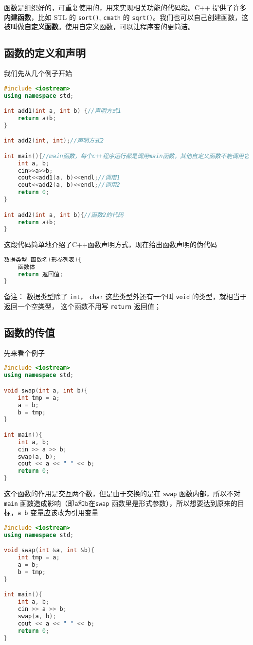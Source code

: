 
\begin{issues}
\issueDraft
\end{issues}

函数是组织好的，可重复使用的，用来实现相关功能的代码段。C++ 提供了许多\textbf{内建函数}，比如 STL 的 \verb|sort()|, \verb|cmath| 的 \verb|sqrt()|。我们也可以自己创建函数，这被叫做\textbf{自定义函数}。使用自定义函数，可以让程序变的更简洁。

\subsection{函数的定义和声明}
我们先从几个例子开始
\begin{lstlisting}[language=cpp]
#include <iostream>
using namespace std;

int add1(int a, int b) {//声明方式1
    return a+b;
}

int add2(int, int);//声明方式2

int main(){//main函数，每个c++程序运行都是调用main函数，其他自定义函数不能调用它
    int a, b;
    cin>>a>>b;
    cout<<add1(a, b)<<endl;//调用1
    cout<<add2(a, b)<<endl;//调用2
    return 0;
}

int add2(int a, int b){//函数2的代码
    return a+b;
}
\end{lstlisting}
这段代码简单地介绍了C++函数声明方式，现在给出函数声明的伪代码
\begin{lstlisting}[language=cpp]
数据类型 函数名(形参列表){
    函数体
    return 返回值;
}
\end{lstlisting}
备注： 数据类型除了 \verb|int|， \verb|char| 这些类型外还有一个叫 \verb|void| 的类型，就相当于返回一个空类型， 这个函数不用写 \verb|return| 返回值；

\subsection{函数的传值}
先来看个例子
\begin{lstlisting}[language=cpp]
#include <iostream>
using namespace std;

void swap(int a, int b){
    int tmp = a;
    a = b;
    b = tmp;
}

int main(){
    int a, b;
    cin >> a >> b;
    swap(a, b);
    cout << a << " " << b;
    return 0;
}
\end{lstlisting}
这个函数的作用是交互两个数，但是由于交换的是在 \verb|swap| 函数内部，所以不对 \verb|main| 函数造成影响（即\verb|a|和\verb|b|在\verb|swap| 函数里是形式参数），所以想要达到原来的目标，\verb|a b| 变量应该改为引用变量
\begin{lstlisting}[language=cpp]
#include <iostream>
using namespace std;

void swap(int &a, int &b){
    int tmp = a;
    a = b;
    b = tmp;
}

int main(){
    int a, b;
    cin >> a >> b;
    swap(a, b);
    cout << a << " " << b;
    return 0;
}
\end{lstlisting}

